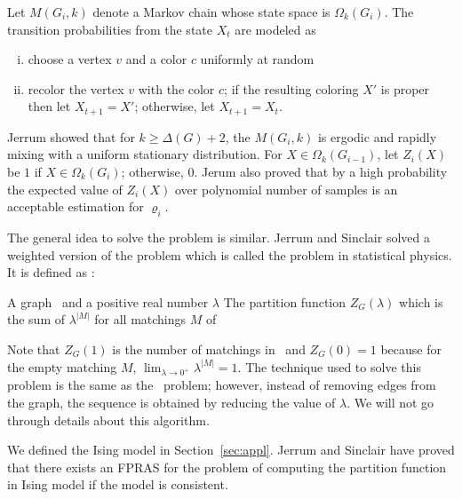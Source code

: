 Let \(M(G_i, k)\) denote a Markov chain whose state space is \(\Omega_k(G_i)\)\@. The transition probabilities from the state \(X_t\) are modeled as 
\begin{enumerate}[i)]
\item choose a vertex \(v\) and a color \(c\) uniformly at random
\item recolor the vertex \(v\) with the color \(c\); if the resulting coloring \(X'\)
is proper then let \(X_{t+1}=X'\); otherwise, let \(X_{t+1}=X_t\)\@.
\end{enumerate}

Jerrum \cite{Jerrum} showed that for \(k \ge \Delta(G) + 2\), the \(M(G_i,k)\) is ergodic and 
rapidly mixing with a uniform stationary distribution. For \(X\in \Omega_k(G_{i-1})\),
let \(Z_i(X)\) be \(1\) if \(X\in \Omega_k(G_i)\); otherwise, \(0\)\@.
Jerum also proved that by a high probability the expected value of 
\(Z_i(X)\) over polynomial number of samples is an
acceptable estimation for \(\varrho_i\)\@.

The general idea to solve the  problem is similar. Jerrum and Sinclair \cite{Jerrum96}
solved a weighted version of the  problem which is called the 
problem in statistical physics. It is defined as :

{A graph \mG\ and a positive real number \(\lambda\)}
{The partition function \(Z_G(\lambda)\) which is the sum of
\(\lambda^{|M|}\) for all matchings \(M\) of \mG}

Note that \(Z_G(1)\) is the number of matchings in \mG\ and \(Z_G(0)=1\) because
for the empty matching \(M\), \(\lim_{\lambda\to 0^+}\lambda^{|M|}=1\). The technique used to
solve this problem is the same as the \ldkcol\ problem; however, instead of removing edges from
the graph, the sequence is obtained by reducing the value of \(\lambda\)\@. We will not 
go through details about this algorithm.

We defined the Ising model in Section~\ref{sec:appl}\@. 
Jerrum and Sinclair \cite{Jer93} have proved that there exists an FPRAS for the
problem of computing the partition function in Ising model if the model 
is consistent.

